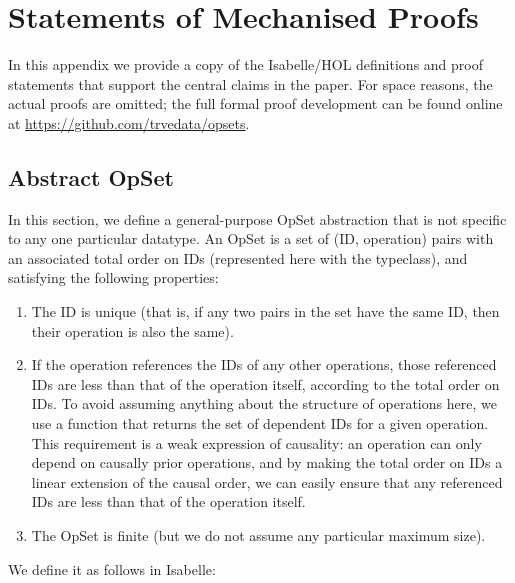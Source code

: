 \section{Statements of Mechanised Proofs}
\label{sect:appendix:statements}

In this appendix we provide a copy of the Isabelle/HOL definitions and proof statements that support the central claims in the paper.
For space reasons, the actual proofs are omitted; the full formal proof development can be found online at \url{https://github.com/trvedata/opsets}.

\subsection{Abstract OpSet}\label{sec:abstract-opset}

In this section, we define a general-purpose OpSet abstraction that is not specific to any one particular datatype.
An OpSet is a set of (ID, operation) pairs with an associated total order on IDs (represented here with the  typeclass), and satisfying the following properties:
\begin{enumerate}
\item The ID is unique (that is, if any two pairs in the set have the same ID, then their operation is also the same).
\item If the operation references the IDs of any other operations, those referenced IDs are less than that of the operation itself, according to the total order on IDs.
To avoid assuming anything about the structure of operations here, we use a function  that returns the set of dependent IDs for a given operation.
This requirement is a weak expression of causality: an operation can only depend on causally prior operations, and by making the total order on IDs a linear extension of the causal order, we can easily ensure that any referenced IDs are less than that of the operation itself.
\item The OpSet is finite (but we do not assume any particular maximum size).
\end{enumerate}
We define it as follows in Isabelle:
